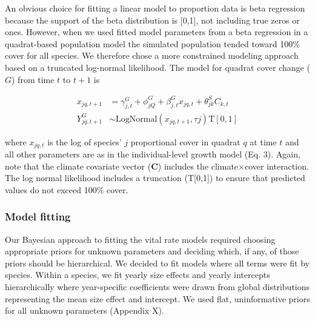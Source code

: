 \documentclass[12pt,]{article}
\begin{document}
An obvious choice for fitting a linear model to proportion data is beta
regression because the support of the beta distribution is {[}0,1{]},
not including true zeros or ones. However, when we used fitted model
parameters from a beta regression in a quadrat-based population model
the simulated population tended toward 100\% cover for all species. We
therefore chose a more constrained modeling approach based on a
truncated log-normal likelihood. The model for quadrat cover change
($G$) from time $t$ to $t+1$ is

\begin{align}
x_{jq,t+1} &= \gamma^{G}_{j,t} + \phi^{G}_{jQ} + \beta^{G}_{j,t}x_{jq,t} + \theta^{S}_{jk}C_{k,t} \\
Y^{G}_{jq,t+1} &\sim \text{LogNormal}(x_{jq,t+1}, \tau{j}) \text{T}[0,1]
\end{align}

where $x_{jq,t}$ is the log of species' $j$ proportional cover in
quadrat $q$ at time $t$ and all other parameters are as in the
individual-level growth model (Eq. 3). Again, note that the climate
covariate vector (\textbf{C}) includes the climate$\times$cover
interaction. The log normal likelihood includes a truncation
(T{[}0,1{]}) to ensure that predicted values do not exceed 100\% cover.

\subsubsection{Model fitting}\label{model-fitting}

Our Bayesian approach to fitting the vital rate models required choosing
appropriate priors for unknown parameters and deciding which, if any, of
those priors should be hierarchical. We decided to fit models where all
terms were fit by species. Within a species, we fit yearly size effects
and yearly intercepts hierarchically where year-specific coefficients
were drawn from global distributions representing the mean size effect
and intercept. We used flat, uninformative priors for all unknown
parameters (Appendix X).
\end{document}
